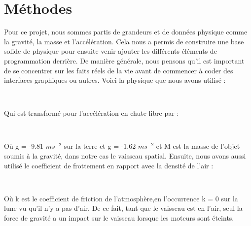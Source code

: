 \section{Méthodes}

Pour ce projet, nous sommes partis de grandeurs et de données physique comme la gravité, la masse et l'accélération. Cela nous a permis de construire une base solide de physique pour ensuite venir ajouter les différents éléments de programmation derrière. De manière générale, nous pensons qu'il est important de se concentrer sur les faits réels de la vie avant de commencer à coder des interfaces graphiques ou autres.
Voici la physique que nous avons utilisé : \cite{SonNasa}
\begin{center}
\fontsize{14.4}{14.4}\\
\end{center}
Qui est transformé pour l’accélération en chute libre par :
\begin{center}
\fontsize{14.4}{14.4}\\
\end{center}
Où g = -9.81 $ms^{-2}$ sur la terre et g = -1.62 $ms^{-2}$ et M est la masse de l’objet soumis à la gravité, dans notre cas le vaisseau spatial.
Ensuite, nous avons aussi utilisé le coefficient de frottement en rapport avec la densité de l’air :
\begin{center}
\fontsize{14.4}{14.4}\\
\end{center}
Où k est le coefficient de friction de l'atmosphère,en l'occurrence k = 0 sur la lune vu qu'il n'y a pas d'air. De ce fait, tant que le vaisseau est en l'air, seul la force de gravité a un impact sur le vaisseau lorsque les moteurs sont éteints.\\

